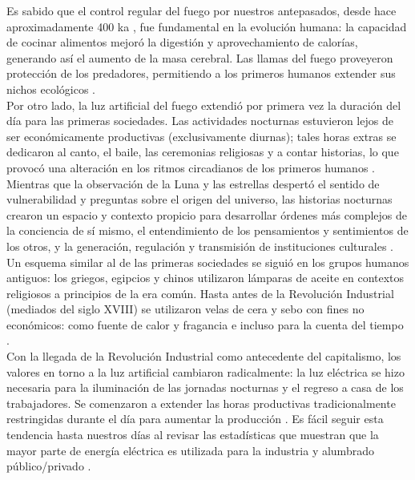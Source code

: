 Es sabido que el control regular del fuego por nuestros antepasados, desde hace aproximadamente 400 ka \citep{Dunbar2014}, fue fundamental en la evolución humana: la capacidad de cocinar alimentos mejoró la digestión y aprovechamiento de calorías, generando así el aumento de la masa cerebral. Las llamas del fuego proveyeron protección de los predadores, permitiendo a los primeros humanos extender sus nichos ecológicos \citep{Wrangham2010}.\\

Por otro lado, la luz artificial del fuego extendió por primera vez la duración del día para las primeras sociedades. Las actividades nocturnas estuvieron lejos de ser económicamente productivas (exclusivamente diurnas); tales horas extras se dedicaron al canto, el baile, las ceremonias religiosas y a contar historias, lo que provocó una alteración en los ritmos circadianos de los primeros humanos \citep{Wiessner2014}.\\

Mientras que la observación de la Luna y las estrellas despertó el sentido de vulnerabilidad y preguntas sobre el origen del universo, las historias nocturnas crearon un espacio y contexto propicio para desarrollar órdenes más complejos de la conciencia de sí mismo, el entendimiento de los pensamientos y sentimientos de los otros, y la generación, regulación y transmisión de instituciones culturales \citep{Wiessner2014}.\\

Un esquema similar al de las primeras sociedades se siguió en los grupos humanos antiguos: los griegos, egipcios y chinos utilizaron lámparas de aceite en contextos religiosos a principios de la era común. Hasta antes de la Revolución Industrial (mediados del siglo XVIII) se utilizaron velas de cera y sebo con fines no económicos: como fuente de calor y fragancia e incluso para la cuenta del tiempo \citep{Duvall1988}.\\

Con la llegada de la Revolución Industrial como antecedente del capitalismo, los valores en torno a la luz artificial cambiaron radicalmente: la luz eléctrica se hizo necesaria para la iluminación de las jornadas nocturnas y el regreso a casa de los trabajadores. Se comenzaron a extender las horas productivas tradicionalmente restringidas durante el día para aumentar la producción \citep{Hudson1992}. Es fácil seguir esta tendencia hasta nuestros días al revisar las estadísticas que muestran que la mayor parte de energía eléctrica es utilizada para la industria y alumbrado público/privado \citep{Ramos2012}.\\ 


